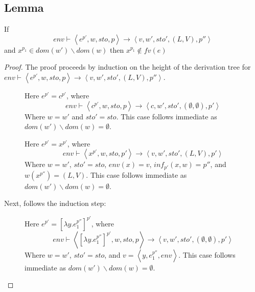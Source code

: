 \documentclass[../../master.tex]{subfiles}
\begin{document}
\subsection{Lemma}
\begin{lemma}[History]\label{lemma:His}
	If 
	$$env\vdash\left\langle e^{p'},w,sto,p\right\rangle\rightarrow\left\langle v,w',sto',(L,V),p''\right\rangle$$
		and $x^{p_1}\in dom(w')\backslash dom(w)$ then $x^{p_1}\notin fv(e)$
\end{lemma}
\begin{proof}
	The proof proceeds by induction on the height of the derivation tree for $env\vdash\left\langle e^{p'},w,sto,p\right\rangle\rightarrow\left\langle v,w',sto',(L,V),p''\right\rangle$.
	\begin{description}
		\item[] Here $e^{p'}=c^{p'}$, where
		$$env\vdash\left\langle c^{p'},w,sto,p\right\rangle\rightarrow\left\langle c,w',sto',(\emptyset,\emptyset),p'\right\rangle$$
		Where $w=w'$ and $sto'=sto$.
		This case follows immediate as $dom(w')\backslash dom(w)=\emptyset$.

		\item[] Here $e^{p'}=x^{p'}$, where
		$$env\vdash\left\langle x^{p'},w,sto,p'\right\rangle\rightarrow\left\langle v,w',sto',(L,V),p'\right\rangle$$
		Where $w=w'$, $sto'=sto$, $env(x)=v$, $inf_{p'}(x,w)=p''$, and $w(x^{p''})=(L,V)$.
		This case follows immediate as $dom(w')\backslash dom(w)=\emptyset$.
	\end{description}
	Next, follows the induction step:

	\begin{description}
		\item[] Here $e^{p'}=[\lambda y.e_1^{p''}]^{p'}$, where
		$$env\vdash\left\langle [\lambda y.e_1^{p''}]^{p'},w,sto,p\right\rangle\rightarrow\left\langle v,w',sto',(\emptyset,\emptyset),p'\right\rangle$$
		Where $w=w'$, $sto'=sto$, and $v=\left\langle y,e_1^{p''},env\right\rangle$.
		This case follows immediate as $dom(w')\backslash dom(w)=\emptyset$.
		

\end{description}
\end{proof}
\end{document}
